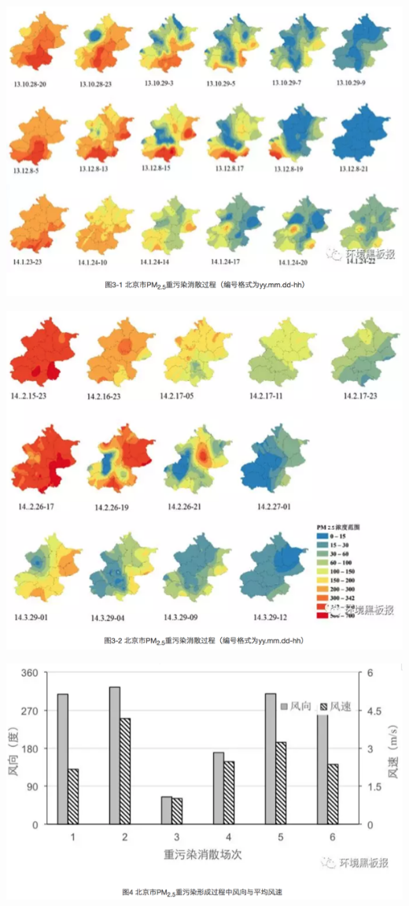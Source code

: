 \documentclass[]{book}
\begin{document}
\includegraphics[width=8.33in]{images/windhaze4}

\includegraphics[width=8.33in]{images/windhaze5}

\includegraphics[width=8.33in]{images/windhaze6}
\end{document}
